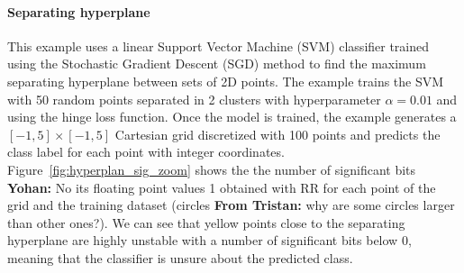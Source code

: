\documentclass[11pt]{article}
\newcommand{\tristan}[1]{\color{orange}\textbf{From Tristan:} #1\color{black}\xspace}
\newcommand{\Yohan}[1]{\color{green!75!black}\textbf{Yohan:} #1\color{black}\xspace}
\begin{document}


\paragraph{Separating hyperplane}

This example uses a linear Support Vector Machine (SVM) classifier trained using the Stochastic Gradient Descent (SGD) method to find the maximum separating hyperplane between sets of 2D points.
The example trains the SVM with 50 random points separated in 2 clusters with hyperparameter $\alpha=0.01$ and using the hinge loss function. Once the model is trained, the example generates a $[-1,5]\times[-1,5]$ Cartesian grid
discretized with 100 points and predicts the class label for each point with integer coordinates. Figure~\ref{fig:hyperplan_sig_zoom} shows the the number of significant bits %
\Yohan{No its floating point values}1
obtained with RR for each point of the grid %
and the training dataset (circles \tristan{why are some circles larger than other ones?}).
We can see that yellow points %
close to the separating hyperplane are highly unstable with a number of significant bits below 0, meaning that
the classifier is unsure about the predicted class. 


\end{document}
